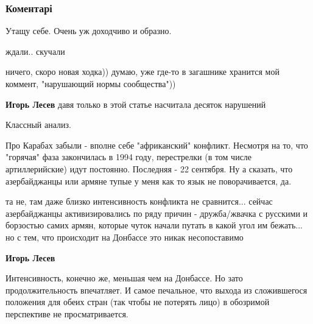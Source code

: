  
 
 
 
 
\subsubsection{Коментарі}

\begin{itemize} %
Утащу себе. Очень уж доходчиво и образно.

ждали.. скучали

\begin{itemize} %
ничего, скоро новая ходка)) думаю, уже где-то в загашнике хранится мой коммент, "нарушающий нормы сообщества"))

\textbf{Игорь Лесев} давя только в этой статье насчитала десяток нарушений

Классный анализ.
\end{itemize} %


Про Карабах забыли - вполне себе "африканский" конфликт. Несмотря на то, что
"горячая" фаза закончилась в 1994 году, перестрелки (в том числе
артиллерийские) идут постоянно. Последняя - 22 сентября. Ну а сказать, что
азербайджанцы или армяне тупые у меня как то язык не поворачивается, да.

\begin{itemize} %

та не, там даже близко интенсивность конфликта не сравнится... сейчас
азербайджанцы активизировались по ряду причин - дружба/жвачка с русскими и
борзостью самих армян, которые чуток начали путать в какой угол им бежать... но
с тем, что происходит на Донбассе это никак несопоставимо

\textbf{Игорь Лесев} 

Интенсивность, конечно же, меньшая чем на Донбассе. Но зато продолжительность
впечатляет. И самое печальное, что выхода из сложившегося положения для обеих
стран (так чтобы не потерять лицо) в обозримой перспективе не просматривается.


\end{itemize}
\end{itemize}
